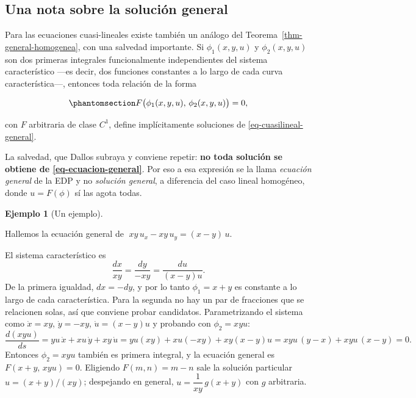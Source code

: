 \documentclass[
  spanish,
  a4paper,
]{scrbook}
\theoremstyle{definition}
\theoremstyle{plain}
\theoremstyle{definition}
\newtheorem{example}{Ejemplo}[chapter]
\theoremstyle{plain}
\theoremstyle{definition}
\theoremstyle{remark}
\begin{document}
\subsection{Una nota sobre la solución
general}\label{sec-ecuacion-general}

Para las ecuaciones cuasi-lineales existe también un análogo del
Teorema~\ref{thm-general-homogenea}, con una salvedad importante. Si
\(\phi_1(x,y,u)\) y \(\phi_2(x,y,u)\) son dos primeras integrales
funcionalmente independientes del sistema característico ---es decir,
dos funciones constantes a lo largo de cada curva característica---,
entonces toda relación de la forma

\begin{equation}\protect\phantomsection\label{eq-ecuacion-general}{
F\big(\phi_1(x,y,u),\,\phi_2(x,y,u)\big) = 0 ,
}\end{equation}

con \(F\) arbitraria de clase \(C^1\), define implícitamente soluciones
de \ref{eq-cuasilineal-general}.

La salvedad, que Dallos subraya y conviene repetir: \textbf{no toda
solución se obtiene de \ref{eq-ecuacion-general}}. Por eso a esa
expresión se la llama \emph{ecuación general} de la EDP y no
\emph{solución general}, a diferencia del caso lineal homogéneo, donde
\(u = F(\phi)\) sí las agota todas.

\begin{example}[Un
ejemplo]\protect\hypertarget{exm-ecuacion-general}{}\label{exm-ecuacion-general}

Hallemos la ecuación general de \(\;xy\,u_x - xy\,u_y = (x-y)\,u\).

El sistema característico es \[
\frac{dx}{xy} = \frac{dy}{-xy} = \frac{du}{(x-y)u} .
\] De la primera igualdad, \(dx = -dy\), y por lo tanto \(\phi_1 = x+y\)
es constante a lo largo de cada característica. Para la segunda no hay
un par de fracciones que se relacionen solas, así que conviene probar
candidatos. Parametrizando el sistema como \(\dot x = xy\),
\(\dot y = -xy\), \(\dot u = (x-y)u\) y probando con \(\phi_2 = xyu\):
\[
\frac{d(xyu)}{ds} = yu\,\dot x + xu\,\dot y + xy\,\dot u
= yu(xy) + xu(-xy) + xy(x-y)u = xyu\,(y - x) + xyu\,(x-y) = 0 .
\] Entonces \(\phi_2 = xyu\) también es primera integral, y la ecuación
general es \(F(x+y,\,xyu) = 0\). Eligiendo \(F(m,n) = m-n\) sale la
solución particular \(u = (x+y)/(xy)\); despejando en general,
\(u = \dfrac{1}{xy}\,g(x+y)\) con \(g\) arbitraria.

\end{example}
\end{document}
